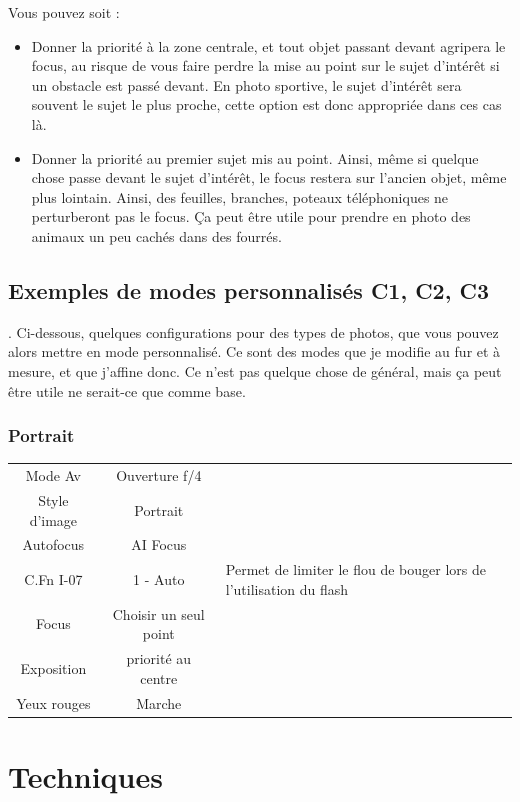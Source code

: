 \documentclass[a4paper,twoside]{article}
\begin{document}
Vous pouvez soit :
\begin{itemize}
\item Donner la priorité à la zone centrale, et tout objet passant devant agripera le focus, au risque de vous faire perdre la mise au point sur le sujet d'intérêt si un obstacle est passé devant. En photo sportive, le sujet d'intérêt sera souvent le sujet le plus proche, cette option est donc appropriée dans ces cas là.
\item Donner la priorité au premier sujet mis au point. Ainsi, même si quelque chose passe devant le sujet d'intérêt, le focus restera sur l'ancien objet, même plus lointain. Ainsi, des feuilles, branches, poteaux téléphoniques ne perturberont pas le focus. Ça peut être utile pour prendre en photo des animaux un peu cachés dans des fourrés.
\end{itemize}

\subsection{Exemples de modes personnalisés C1, C2, C3}\label{sec:exemple_C1C2C3}.
Ci-dessous, quelques configurations pour des types de photos, que vous pouvez alors mettre en mode personnalisé. Ce sont des modes que je modifie au fur et à mesure, et que j'affine donc. Ce n'est pas quelque chose de général, mais ça peut être utile ne serait-ce que comme base.

\subsubsection{Portrait}

\begin{tabular}{|c|c|p{5cm}|}
Mode Av & Ouverture f/4 & \\
Style d'image & Portrait & \\
Autofocus & AI Focus  & \\
C.Fn I-07 & 1 - Auto & Permet de limiter le flou de bouger lors de l'utilisation du flash\\
Focus & Choisir un seul point & \\
Exposition & priorité au centre & \\
Yeux rouges & Marche & \\
\end{tabular}

\section{Techniques}
\end{document}
